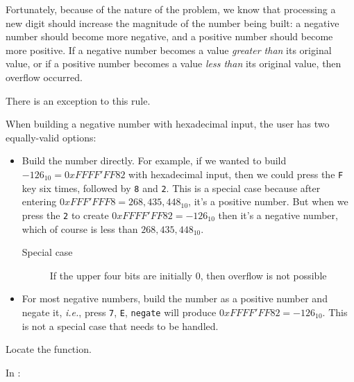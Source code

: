 Fortunately, because of the nature of the problem, we know that processing a new digit should increase the magnitude of the number being built:
a negative number should become more negative, and a positive number should become more positive.
If a negative number becomes a value \textit{greater than} its original value, or if a positive number becomes a value \textit{less than} its original value, then overflow occurred.

There is an exception to this rule.

When building a negative number with hexadecimal input, the user has two equally-valid options:

\begin{itemize}
    \item Build the number directly.
        For example, if we wanted to build $-126_{10} = 0xFFFF'FF82$ with hexadecimal input, then we could press the \texttt{F} key six times, followed by \texttt{8} and \texttt{2}.
        This is a special case because after entering $0xFFF'FFF8 = 268,435,448_{10}$, it's a positive number.
        But when we press the \texttt{2} to create $0xFFFF'FF82 = -126_{10}$ then it's a negative number, which of course is less than $268,435,448_{10}$.
        \begin{description}
            \item[Special case] If the upper four bits are initially 0, then overflow is not possible
        \end{description}
    \item For most negative numbers, build the number as a positive number and negate it,
        \textit{i.e.}, press \texttt{7}, \texttt{E}, \texttt{negate} will produce $0xFFFF'FF82 = -126_{10}$.
        This is not a special case that needs to be handled.
\end{itemize}

Locate the  function.
\begin{description}
\end{description}

In :
\begin{description}
\end{description}


